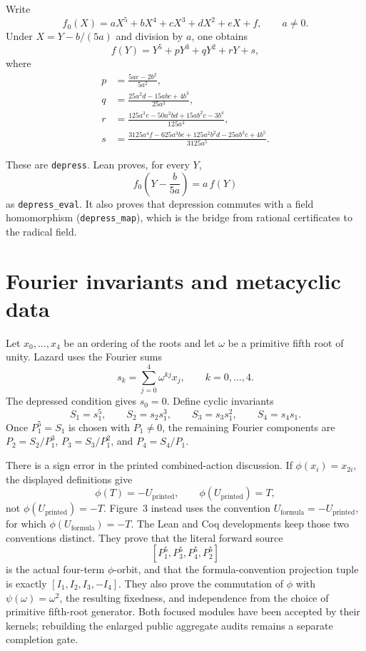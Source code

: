 \documentclass[11pt,a4paper,oneside]{article}
\newcommand{\lean}[1]{\nolinkurl{#1}}
\begin{document}
Write
\[
 f_0(X)=aX^5+bX^4+cX^3+dX^2+eX+f,\qquad a\ne0.
\]
Under $X=Y-b/(5a)$ and division by $a$, one obtains
\[
 f(Y)=Y^5+pY^3+qY^2+rY+s,
\]
where
\begin{align*}
p&=\frac{5ac-2b^2}{5a^2},\\
q&=\frac{25a^2d-15abc+4b^3}{25a^3},\\
r&=\frac{125a^3e-50a^2bd+15ab^2c-3b^4}{125a^4},\\
s&=\frac{3125a^4f-625a^3be+125a^2b^2d-25ab^3c+4b^5}
        {3125a^5}.
\end{align*}

These are \lean{depress}.  Lean proves, for every $Y$,
\[
 f_0\!\left(Y-\frac{b}{5a}\right)=a\,f(Y)
\]
as \lean{depress_eval}.  It also proves that depression commutes with a field
homomorphism (\lean{depress_map}), which is the bridge from rational
certificates to the radical field.

\section{Fourier invariants and metacyclic data}

Let $x_0,\ldots,x_4$ be an ordering of the roots and let $\omega$ be a
primitive fifth root of unity.  Lazard uses the Fourier sums
\[
 s_k=\sum_{j=0}^{4}\omega^{kj}x_j,\qquad k=0,\ldots,4.
\]
The depressed condition gives $s_0=0$.  Define cyclic invariants
\[
 S_1=s_1^5,\qquad S_2=s_2s_1^3,\qquad
 S_3=s_3s_1^2,\qquad S_4=s_4s_1.
\]
Once $P_1^5=S_1$ is chosen with $P_1\ne0$, the remaining Fourier components
are $P_2=S_2/P_1^3$, $P_3=S_3/P_1^2$, and $P_4=S_4/P_1$.

There is a sign error in the printed combined-action discussion.  If
$\phi(x_i)=x_{2i}$, the displayed definitions give
\[
  \phi(T)=-U_{\mathrm{printed}},\qquad
  \phi(U_{\mathrm{printed}})=T,
\]
not $\phi(U_{\mathrm{printed}})=-T$.  Figure~3 instead uses the convention
$U_{\mathrm{formula}}=-U_{\mathrm{printed}}$, for which
$\phi(U_{\mathrm{formula}})=-T$.  The Lean and Coq developments keep those
two conventions distinct.  They prove that the literal forward source
\[
  [P_1^5,P_3^5,P_4^5,P_2^5]
\]
is the actual four-term $\phi$-orbit, and that the formula-convention
projection tuple is exactly $[I_1,I_2,I_3,-I_4]$.  They also prove the
commutation of $\phi$ with $\psi(\omega)=\omega^2$, the resulting fixedness,
and independence from the choice of primitive fifth-root generator.  Both
focused modules have been accepted by their kernels; rebuilding the enlarged
public aggregate audits remains a separate completion gate.
\end{document}
